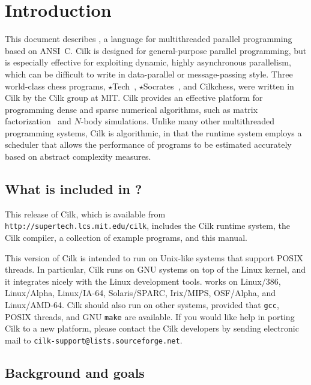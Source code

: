 \chapter{Introduction}
\addtocounter{footnote}{1}

This document describes \sysnameversion{}, a language for
multithreaded parallel programming based on ANSI~C\@.  Cilk is
designed for general-purpose parallel programming, but is especially
effective for exploiting dynamic, highly asynchronous parallelism,
which can be difficult to write in data-parallel
or message-passing style.  Three
world-class chess programs, $\star$Tech~\cite{Kuszmaul94},
$\star$Socrates~\cite{JoergKu94}, and Cilkchess, were written in Cilk
by the Cilk group at MIT.  Cilk provides an effective platform for
programming dense and sparse numerical algorithms, such as matrix
factorization~\cite{BlumofeFrJo96a} and $N$-body simulations.  Unlike
many other multithreaded programming systems, Cilk is algorithmic, in
that the runtime system employs a scheduler that allows the
performance of programs to be estimated
accurately~\cite{BlumofeJoKu95} based on abstract complexity measures.

\section{What is included in {\sysnameversion}?}

This release of Cilk, which is available from
\texttt{http://supertech.lcs.mit.edu/cilk}, includes the Cilk runtime
system, the Cilk compiler, a collection of example programs, and this
manual.

This version of Cilk is intended to run on Unix-like systems that
support POSIX threads.  In particular, Cilk runs on GNU systems on top
of the Linux kernel, and it integrates nicely with the Linux
development tools.  {\sysnameversion} works on Linux/386, Linux/Alpha,
Linux/IA-64, Solaris/SPARC, Irix/MIPS, OSF/Alpha, and Linux/AMD-64.
Cilk should also run on other systems, provided that \texttt{gcc},
POSIX threads, and GNU \texttt{make} are available.  If you would like
help in porting Cilk to a new platform, please contact the Cilk
developers by sending electronic mail to
\texttt{cilk-support@lists.sourceforge.net}.

\section{Background and goals}

